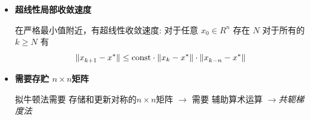 \documentclass[handout,10pt]{beamer} %
\begin{document}
\begin{frame}[fragile]
\frametitle{}
\begin{itemize}
\item \textbf{超线性局部收敛速度}

在严格最小值附近，有超线性收敛速度:
对于任意 $x_0\in R^n$ 存在 $N$ 对于所有的 $k\geq N$ 有
$$
    \|x_{k+1}^{}-x^*\| \leq \textnormal{const}\cdot \|x_k - x^*\| \cdot \|x_{k-n}^{} - x^*\|
$$



\item \textbf{需要存贮 $n\times n$矩阵 }

拟牛顿法需要 存储和更新对称的$n\times n$矩阵
$\rightarrow$ 需要 
辅助算术运算
  $\rightarrow$\textit{共轭梯度法}
\end{itemize}

\end{frame}


    
\end{document}
